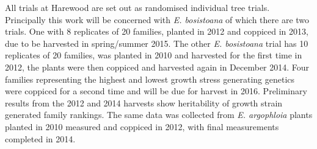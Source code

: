 All trials at Harewood are set out as randomised individual tree trials. Principally
this work will be concerned with \textit{E. bosistoana} of which there  are two
trials. One with 8 replicates of 20 families, planted in 2012 and coppiced in
2013, due to be harvested in spring/summer 2015. The other
\textit{E. bosistoana} trial has 10 replicates of 20 families, was planted in
2010 and harvested for the first time in 2012, the plants were then coppiced
and harvested again in December 2014. Four families representing the highest and
lowest growth stress generating genetics were coppiced for a second time and
will be due for harvest in 2016. Preliminary results from the 2012 and 2014
harvests show heritability of growth strain generated family
rankings. The same data was collected from \textit{E. argophloia} plants planted
in 2010 measured and coppiced in 2012, with final measurements completed in 2014.